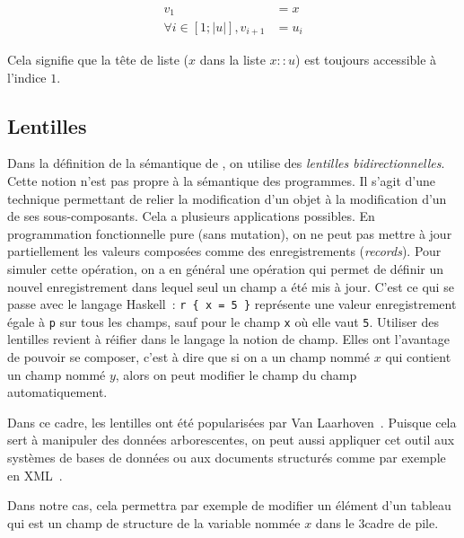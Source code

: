 \begin{align*}
                       v_1 & = x \\
  ∀ i ∈ [1; |u|] , v_{i+1} & = u_i
\end{align*}

Cela signifie que la tête de liste ($x$ dans la liste $x :: u$) est toujours
accessible à l'indice $1$.

\subsection*{Lentilles}

Dans la définition de la sémantique de \langname, on utilise des \emph{lentilles
bidirectionnelles}. Cette notion n'est pas propre à la sémantique des
programmes. Il s'agit d'une technique permettant de relier la modification d'un
objet à la modification d'un de ses sous-composants. Cela a plusieurs
applications possibles. En programmation fonctionnelle pure (sans mutation), on
ne peut pas mettre à jour partiellement les valeurs composées comme des
enregistrements (\emph{records}). Pour simuler cette opération, on a en général
une opération qui permet de définir un nouvel enregistrement dans lequel seul un
champ a été mis à jour. C'est ce qui se passe avec le langage
Haskell~: \texttt{r \{ x = 5 \}} représente une valeur
enregistrement égale à \texttt{p} sur tous les champs, sauf pour le champ
\texttt{x} où elle vaut \texttt{5}. Utiliser des lentilles revient à réifier
dans le langage la notion de champ. Elles ont l'avantage de pouvoir se
composer, c'est à dire que si on a un champ nommé $x$ qui contient un champ
nommé $y$, alors on peut modifier le champ du champ automatiquement.

Dans ce cadre, les lentilles ont été popularisées par Van
Laarhoven~\cite{LaarhovenLenses}. Puisque cela sert à manipuler des données
arborescentes, on peut aussi appliquer cet outil aux systèmes de bases de
données ou aux documents structurés comme par exemple en
XML~\cite{PierceLenses}.

Dans notre cas, cela permettra par exemple de modifier un élément d'un tableau
qui est un champ de structure de la variable nommée $x$ dans le 3\ieme cadre de
pile.


